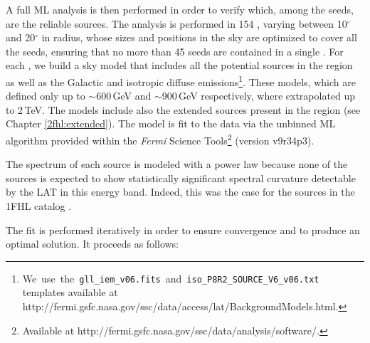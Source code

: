 A full ML analysis is then performed in order to verify which,
among the seeds, are the reliable sources. 
The analysis is performed in 154 \rois{}, varying between 10$^{\circ}$ and 20$^{\circ}$ in radius, whose sizes and positions in the sky are optimized to cover all the seeds, ensuring that no more than 45 seeds are contained in a single \roi{}.
For each \roi{}, we build
a sky model that includes all the potential sources in the region
as well as the  Galactic and isotropic diffuse emissions\footnote{We~use~the~{\tt gll\_iem\_v06.fits}~and~{\tt iso\_P8R2\_SOURCE\_V6\_v06.txt}
	templates available at \\
	http://fermi.gsfc.nasa.gov/ssc/data/access/lat/BackgroundModels.html.}.
These models, which are defined only up to $\sim$600\,GeV and  $\sim$900\,GeV respectively, where extrapolated up to 2\,TeV.
The \roi{} models include also the extended sources present in the region (see Chapter \ref{2fhl:extended}).
The model is fit to the data via the unbinned ML algorithm provided
within the {\it Fermi} Science Tools\footnote{Available at 
	http://fermi.gsfc.nasa.gov/ssc/data/analysis/software/.} (version v9r34p3).

The spectrum of each source is modeled with a power law because
none of the sources is expected to show statistically
significant spectral
curvature detectable by the LAT in this energy band. 
Indeed, this was the case for the sources in the 1FHL catalog \citep{1FHL}.

The fit is performed iteratively in order to ensure convergence and 
to produce an optimal solution. It proceeds as follows:

